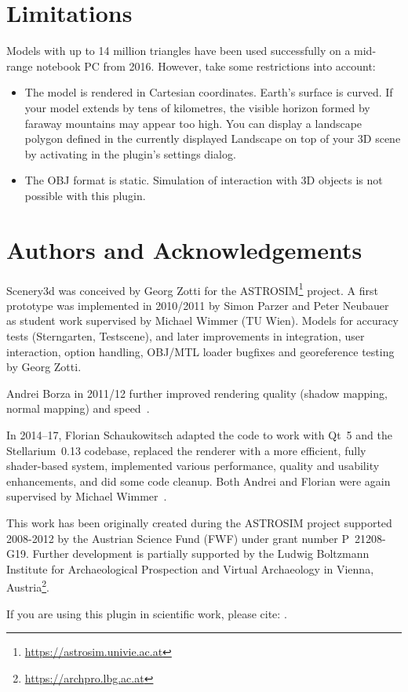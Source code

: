 \section{Limitations}
\label{sec:scenery3d:Limitations}

Models with up to 14 million triangles have been used successfully on
a mid-range notebook PC from 2016. However, take some restrictions
into account:

\begin{itemize}
\item The model is rendered in Cartesian coordinates. Earth's surface
  is curved. If your model extends by tens of kilometres, the visible
  horizon formed by faraway mountains may appear too high. You can
   display a landscape polygon defined in the
  currently displayed Landscape on top of your 3D scene by activating
   in the plugin's
  settings dialog.
\item
  The OBJ format is static. Simulation of interaction with 3D objects
  is not possible with this plugin.
\end{itemize}

\section*{Authors and Acknowledgements}
\label{sec:scenery3d:Acknowledgments}


Scenery3d was conceived by Georg Zotti for the
ASTROSIM\footnote{\url{https://astrosim.univie.ac.at}} project. A first
prototype was implemented in 2010/2011 by Simon Parzer and
Peter Neubauer as student work supervised by Michael Wimmer (TU Wien).
Models for accuracy tests (Sterngarten, Testscene), and later
improvements in integration, user interaction,  option handling,
OBJ/MTL loader bugfixes and georeference testing by Georg Zotti.

Andrei Borza in 2011/12 further improved rendering quality (shadow
mapping, normal mapping) and
speed~\citep{Zotti-Neubauer:VSMM2012,Zotti-Neubauer:EuroMed2012,Zotti:2012:SpringerAA}.

In 2014--17,
Florian Schaukowitsch adapted the code to work with Qt~5 and the 
Stellarium~0.13 codebase, replaced the renderer with a more efficient, fully
shader-based system, implemented various performance, quality and usability
enhancements, and did some code cleanup. Both Andrei and Florian were again
supervised by Michael Wimmer~\citep{Zotti:CHNT2015,Zotti:SEAC2015,Zotti:SEAC2017}.

This work has been originally created during the ASTROSIM project supported 2008-2012 by
the Austrian Science Fund (FWF) under grant number P~21208-G19. Further development is
partially supported by the Ludwig Boltzmann Institute for Archaeological Prospection and Virtual Archaeology in Vienna, Austria\footnote{%
  \url{https://archpro.lbg.ac.at}}.

If you are using this plugin in scientific work, please cite: \citep{Zotti:CHNT2015,Zotti:SEAC2015,Zotti:SEAC2017,Zotti-etal:SIA2016,Zotti:TAG2016,Zotti-etal:JSA2020.6.2}.



